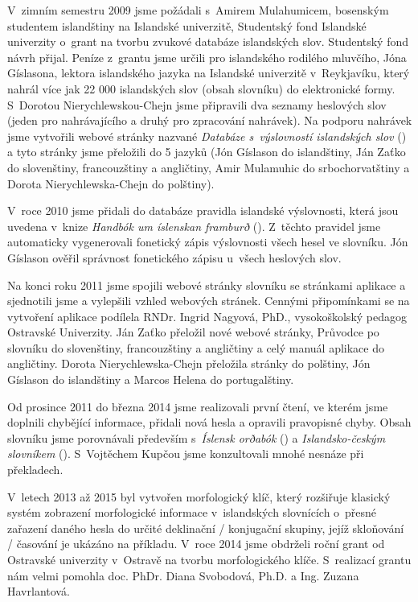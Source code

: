 V~zimním semestru 2009 jsme požádali s~Amirem Mulahumicem, bosenským studentem islandštiny na Islandské univerzitě, Studentský fond Islandské univerzity o~grant na tvorbu zvukové databáze islandských slov. 
Studentský fond návrh přijal. Peníze z~grantu jsme určili pro islandského rodilého mluvčího, Jóna Gíslasona, lektora islandského jazyka na Islandské univerzitě v~Reykjavíku, který nahrál více jak 22 000 islandských slov (obsah slovníku) do elektronické formy. 
S~Dorotou Nierychlewskou-Chejn jsme připravili dva seznamy heslových slov (jeden pro nahrávajícího a druhý pro zpracování nahrávek). Na podporu nahrávek jsme vytvořili webové stránky nazvané \textit{Databáze s~výslovností islandských slov} (\cite {int13}) a tyto stránky jsme přeložili do 5 jazyků (Jón Gíslason do islandštiny, Ján Zaťko do slovenštiny, francouzštiny a angličtiny, Amir Mulamuhic do srbochorvatštiny a Dorota Nierychlewska-Chejn do polštiny).

V~roce 2010 jsme přidali do databáze pravidla islandské výslovnosti, která jsou uvedena v~knize \textit{Handbók um íslenskan framburð} (\cite {is2}). Z~těchto pravidel jsme automaticky vygenerovali fonetický zápis výslovnosti všech hesel ve slovníku. 
Jón Gíslason ověřil správnost fonetického zápisu u~všech heslových slov.

Na konci roku 2011 jsme spojili webové stránky slovníku se stránkami aplikace a sjednotili jsme a vylepšili vzhled webových stránek. Cennými připomínkami se na vytvoření aplikace podílela
RNDr. Ingrid Nagyová, PhD., vysokoškolský pedagog Ostravské Univerzity. Ján Zaťko přeložil nové webové stránky, Průvodce po slovníku do slovenštiny, francouzštiny a angličtiny a celý manuál aplikace do angličtiny. 
Dorota Nierychlewska-Chejn přeložila stránky do polštiny, Jón Gíslason do islandštiny a Marcos Helena do portugalštiny.

Od prosince 2011 do března 2014 jsme realizovali první čtení, ve kterém jsme doplnili chybějící informace, přidali nová hesla a opravili pravopisné chyby. 
Obsah slovníku jsme porovnávali především s~\textit{Íslensk orðabók}  (\cite {is}) a \textit{Islandsko-českým slovníkem} (\cite {is7}). S~Vojtěchem Kupčou jsme konzultovali mnohé nesnáze při překladech.

V~letech 2013 až 2015 byl vytvořen morfologický klíč, který rozšiřuje klasický systém zobrazení morfologické informace v~islandských slovnících o~přesné zařazení daného hesla do určité deklinační / konjugační skupiny, jejíž
skloňování / časování je ukázáno na příkladu. V~roce 2014 jsme obdrželi roční grant od Ostravské univerzity v~Ostravě na tvorbu morfologického klíče. S~realizací grantu nám velmi pomohla doc. PhDr. Diana Svobodová, Ph.D. a Ing. Zuzana Havrlantová.

